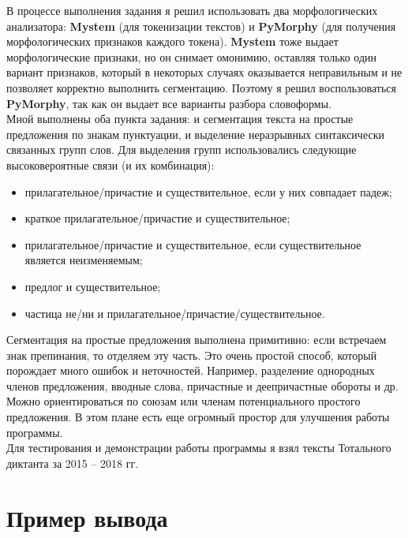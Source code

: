 \documentclass[oneside,final,12pt]{article}
\begin{document}
В процессе выполнения задания я решил использовать два морфологических анализатора: \textbf{Mystem} (для токенизации текстов) и \textbf{PyMorphy} (для получения морфологических признаков каждого токена). \textbf{Mystem} тоже выдает морфологические признаки, но он снимает омонимию, оставляя только один вариант признаков, который в некоторых случаях оказывается неправильным и не позволяет корректно выполнить сегментацию. Поэтому я решил воспользоваться \textbf{PyMorphy}, так как он выдает все варианты разбора словоформы.\\

Мной выполнены оба пункта задания: и сегментация текста на простые предложения по знакам пунктуации, и выделение неразрывных синтаксически связанных групп слов. Для выделения групп использовались следующие высоковероятные связи (и их комбинация):

\begin{itemize}
	\item прилагательное/причастие и существительное, если у них совпадает падеж;
	\item краткое прилагательное/причастие и существительное;
	\item прилагательное/причастие и существительное, если существительное является неизменяемым;
	\item предлог и существительное;
	\item частица не/ни и прилагательное/причастие/существительное.
\end{itemize}

Сегментация на простые предложения выполнена примитивно: если встречаем знак препинания, то отделяем эту часть. Это очень простой способ, который порождает много ошибок и неточностей. Например, разделение однородных членов предложения, вводные слова, причастные и деепричастные обороты и др. Можно ориентироваться по союзам или членам потенциального простого предложения. В этом плане есть еще огромный простор для улучшения работы программы.\\

Для тестирования и демонстрации работы программы я взял тексты Тотального диктанта за 2015 -- 2018 гг.

\section{Пример вывода}
\end{document}
